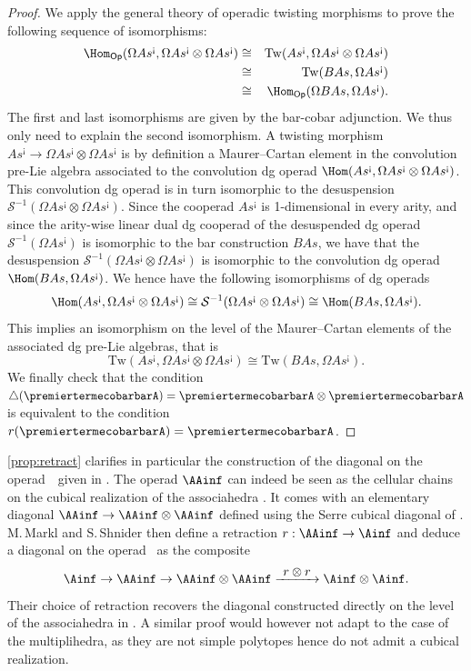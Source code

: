 \documentclass[JEP,XML,SOM,NoFloatCountersInSection,Unicode,published]{cedram}
\def\To#1{\mathchoice{\xrightarrow{\textstyle\kern4pt#1\kern3pt}}{\stackrel{#1}{\longrightarrow}}{}{}}
\theoremstyle{definition}
\theoremstyle{plain}
\begin{document}
\begin{proof}
We apply the general theory of operadic twisting morphisms \cite[\S 6.4]{LodayVallette12} to prove the following sequence of isomorphisms:
\begin{eqnarray*}
\Hom_{\mathsf{Op}} (\Omega As^{\text{¡}}, \Omega As^{\text{¡}} \otimes \Omega As^{\text{¡}}) & \cong & \mathrm{Tw}(As^{\text{¡}}, \Omega As^{\text{¡}} \otimes \Omega As^{\text{¡}}) \\
& \cong & \mathrm{Tw}(B As,\Omega As^{\text{¡}}) \\
& \cong & \Hom_{\mathsf{Op}} (\Omega B As, \Omega As^{\text{¡}}).
\end{eqnarray*}
The first and last isomorphisms are given by the bar-cobar adjunction. We thus only need to explain the second isomorphism.
A twisting morphism $As^{\text{¡}}\to \Omega As^{\text{¡}} \otimes \Omega As^{\text{¡}}$ is by definition a Maurer--Cartan element in the convolution pre-Lie algebra associated to the convolution dg operad $\Hom (As^{\text{¡}}, \Omega As^{\text{¡}} \otimes \Omega As^{\text{¡}})$.
This convolution dg operad is in turn isomorphic to the desuspension $\mathcal{S}^{-1}(\Omega As^{\text{¡}} \otimes \Omega As^{\text{¡}})$.
Since the cooperad $As^{\text{¡}}$ is 1-dimensional in every arity, and since the arity-wise linear dual dg cooperad of the desuspended dg operad $\mathcal{S}^{-1}(\Omega As^{\text{¡}})$ is isomorphic to the bar construction $B As$, we have that
the desuspension $\mathcal{S}^{-1}(\Omega As^{\text{¡}} \otimes \Omega As^{\text{¡}})$ is isomorphic to the convolution dg operad $\Hom (B As, \Omega As^{\text{¡}})$.
We hence have the following isomorphisms of dg operads
\[
\Hom (As^{\text{¡}}, \Omega As^{\text{¡}} \otimes \Omega As^{\text{¡}}) \cong \mathcal{S}^{-1}(\Omega As^{\text{¡}} \otimes \Omega As^{\text{¡}}) \cong \Hom (B As, \Omega As^{\text{¡}}).
\]
This implies an isomorphism on the level of the Maurer--Cartan elements of the associated dg pre-Lie algebras, that is
\[
\mathrm{Tw}(As^{\text{¡}}, \Omega As^{\text{¡}} \otimes \Omega As^{\text{¡}}) \cong \mathrm{Tw}(B As,\Omega As^{\text{¡}}).
\]
We finally check that the condition $\triangle (\premiertermecobarbarA) = \premiertermecobarbarA \otimes \premiertermecobarbarA$ is equivalent to the condition $r(\premiertermecobarbarA)=\premiertermecobarbarA$.
\end{proof}

\cref{prop:retract} clarifies in particular the construction of the diagonal on the ope\-rad~\Ainf\ given in \cite{MarklShnider06}.
The operad $\AAinf$ can indeed be seen as the cellular chains on the cubical realization of the associahedra \cite[\S 9.3.1]{LodayVallette12}.
It comes with an elementary diagonal $\AAinf \to \AAinf \otimes \AAinf$ defined using the Serre cubical diagonal of \cite{Serre51}.
M.\,Markl and S.\,Shnider then define a retraction $r:\AAinf \to \Ainf$ and deduce a diagonal on the operad \Ainf\ as the composite
\[
\Ainf \to \AAinf \to \AAinf \otimes \AAinf \To{r \otimes r} \Ainf \otimes \Ainf.
\]
Their choice of retraction recovers the diagonal constructed directly on the level of the associahedra in \cite[Th.\,2]{MTTV19}.
A similar proof would however not adapt to the case of the multiplihedra, as they are not simple polytopes hence do not admit a cubical realization.
\end{document}
